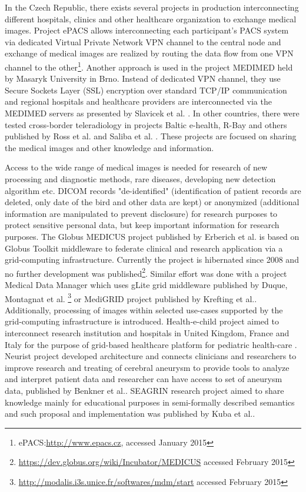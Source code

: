 In the Czech Republic, there exists several projects in production interconnecting different hospitals, clinics and other healthcare organization to exchange medical images. Project ePACS allows interconnecting each participant's PACS system via dedicated Virtual Private Network VPN channel to the central node and exchange of medical images are realized by routing the data flow from one VPN channel to the other\footnote{ePACS:\url{http://www.epacs.cz}, accessed January 2015}. Another approach is used in the project MEDIMED held by Masaryk University in Brno. Instead of dedicated VPN channel, they use Secure Sockets Layer (SSL) encryption over standard TCP/IP communication and regional hospitals and healthcare providers are interconnected via the MEDIMED servers as presented by Slavicek et al. \cite{Slavicek2010}.%
In other countries, there were tested cross-border teleradiology in projects Baltic e-health, R-Bay and others published by Ross et al. \cite{Ross2010} and Saliba et al. \cite{Saliba2012}.
These projects are focused on sharing the medical images and other knowledge and information.

Access to the wide range of medical images is needed for research of new processing and diagnostic methods, rare diseases, developing new detection algorithm etc.  DICOM records "de-identified" (identification of patient records are deleted, only date of the bird and other data are kept) or anonymized (additional information are manipulated to prevent disclosure) for research purposes to protect sensitive personal data, but keep important information for research purposes. The Globus MEDICUS project published by Erberich et al.\cite{Erberich2006,Erberich2007} is based on Globus Toolkit middleware to federate clinical and research application via a grid-computing infrastructure. Currently the project is hibernated since 2008 and no further development was published\footnote{\url{https://dev.globus.org/wiki/Incubator/MEDICUS} accessed February 2015}. Similar effort was done with a project Medical Data Manager which uses gLite grid middleware published by Duque, Montagnat et al.\cite{Duque,Montagnat2007} \footnote{\url{http://modalis.i3s.unice.fr/softwares/mdm/start} accessed February 2015} or MediGRID project published by Krefting et al.\cite{Krefting2009, Krefting2010}. Additionally, processing of images within selected use-cases supported by the grid-computing infrastructure is introduced\cite{Krefting2010}. Health-e-child project aimed to interconnect research institution and hospitals in United Kingdom, France and Italy for the purpose of grid-based healthcare platform for pediatric health-care \cite{Skaburskas2008}. Neurist project developed architecture and connects clinicians and researchers to improve research and treating of cerebral aneurysm to provide tools to analyze and interpret patient data and researcher can have access to set of aneurysm data, published by Benkner et al.\cite{Benkner2010}.
SEAGRIN research project aimed to  share knowledge mainly for educational purposes in semi-formally described semantics and such proposal and implementation was published by Kuba et al.\cite{Kuba2006}. 

